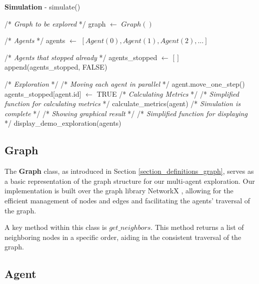 \begin{algorithm}
\caption{\textbf{Simulation} - simulate()}
\label{alg:simulate}
\begin{algorithmic}

    \State /* \textit{Graph to be explored} */
    \State graph $\gets$ $Graph()$

    \State /* \textit{Agents} */
    \State agents $\gets$ $[Agent(0), Agent(1), Agent(2), ...]$
    \State

    \State /* \textit{Agents that stopped already} */
    \State agents\_stopped $\gets$ $[$ $ ]$
        \State append(agents\_stopped, FALSE)
    \EndFor
    \State

    \State /* \textit{Exploration} */
            \State /* \textit{Moving each agent in parallel} */
            \State agent.move\_one\_step()
                \State agents\_stopped[agent.id] $\gets$ TRUE
            \EndIf
        \EndFor
    \EndWhile
    \State 
    \State /* \textit{Calculating Metrics} */
        \State /* \textit{Simplified function for calculating metrics} */
        \State calculate\_metrics(agent)
    \EndFor
    \State
    \State /* \textit{Simulation is complete} */
    \State /* \textit{Showing graphical result} */
    \State /* \textit{Simplified function for displaying} */
    \State display\_demo\_exploration(agents)
\end{algorithmic}
\end{algorithm}
    

\subsection{Graph}
\label{section_modeling_graph}

The \textbf{Graph} class, as introduced in Section \ref{section_definitions_graph},
serves as a basic representation of the graph structure for our multi-agent exploration.
Our implementation is built over the graph library NetworkX \cite{Hagberg2008}, allowing for the efficient management of nodes and edges and facilitating the agents' traversal of the graph.


A key method within this class is $get\_neighbors$.
This method returns a list of neighboring nodes in a specific order, aiding in the consistent traversal of the graph.

\subsection{Agent}
\label{section_modeling_agent}

